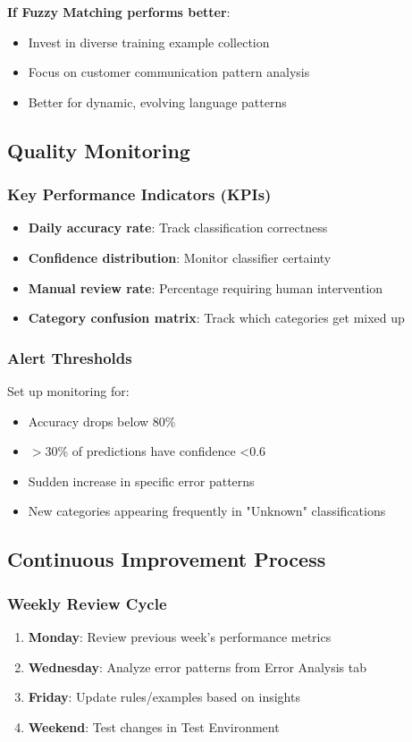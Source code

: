 \documentclass[11pt,a4paper]{article}
\begin{document}
\textbf{If Fuzzy Matching performs better}:
\begin{itemize}
    \item Invest in diverse training example collection
    \item Focus on customer communication pattern analysis
    \item Better for dynamic, evolving language patterns
\end{itemize}

\subsection{Quality Monitoring}

\subsubsection{Key Performance Indicators (KPIs)}
\begin{itemize}
    \item \textbf{Daily accuracy rate}: Track classification correctness
    \item \textbf{Confidence distribution}: Monitor classifier certainty
    \item \textbf{Manual review rate}: Percentage requiring human intervention
    \item \textbf{Category confusion matrix}: Track which categories get mixed up
\end{itemize}

\subsubsection{Alert Thresholds}
Set up monitoring for:
\begin{itemize}
    \item Accuracy drops below 80\%
    \item $>$30\% of predictions have confidence <0.6
    \item Sudden increase in specific error patterns
    \item New categories appearing frequently in "Unknown" classifications
\end{itemize}

\subsection{Continuous Improvement Process}

\subsubsection{Weekly Review Cycle}
\begin{enumerate}
    \item \textbf{Monday}: Review previous week's performance metrics
    \item \textbf{Wednesday}: Analyze error patterns from Error Analysis tab
    \item \textbf{Friday}: Update rules/examples based on insights
    \item \textbf{Weekend}: Test changes in Test Environment
\end{enumerate}
\end{document}
